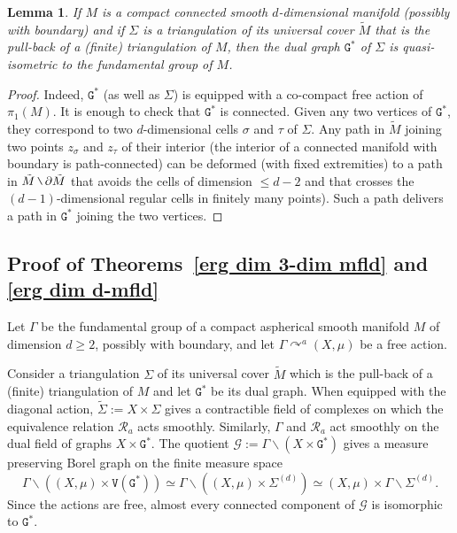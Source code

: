 \documentclass[11pt]{amsart}
\theoremstyle{definition}
\theoremstyle{plain}
\newtheorem{lemma}[definition]{Lemma}
\newcommand{\<}{\langle}
\renewcommand{\>}{\rangle}
\newcommand{\actson}{\curvearrowright}
\newcommand{\pmp}{\text{p.m.p.}}
\newcommand\RR{\mathscr{R}}
\newcommand\GGG{\mathtt{G}}
\newcommand\VVV{\mathtt{V}}
\newcommand\GG{\mathcal{G}}
\newcommand{\mysetminusD}{\hbox{\tikz{\draw[line width=0.6pt,line cap=round] (3pt,0) -- (0,6pt);}}}
\newcommand{\mysetminusT}{\mysetminusD}
\newcommand{\mysetminusS}{\hbox{\tikz{\draw[line width=0.45pt,line cap=round] (2pt,0) -- (0,4pt);}}}
\newcommand{\mysetminusSS}{\hbox{\tikz{\draw[line width=0.4pt,line cap=round] (1.5pt,0) -- (0,3pt);}}}
\newcommand{\mysetminus}{\mathbin{\mathchoice{\mysetminusD}{\mysetminusT}{\mysetminusS}{\mysetminusSS}}}%
\begin{document}
\begin{lemma}\label{lem:growth cond for dual graph}
If $M$ is a compact connected smooth $d$-dimensional manifold (possibly with boundary) and if ${\Sigma} $ is a triangulation of its universal cover $\tilde{M}$ that is the pull-back of a (finite)  triangulation of $M$, then the dual graph ${{\GGG}^*}$ of ${\Sigma} $ is quasi-isometric to the fundamental group of $M$.
\end{lemma}

\begin{proof}
Indeed, ${{\GGG}^*}$ (as well as ${\Sigma} $) is equipped with a co-compact free action of $\pi_1(M)$.
It is enough to check that ${{\GGG}^*}$ is connected.
Given any two vertices of ${{\GGG}^*}$, they correspond to two $d$-dimensional cells $\sigma$ and $\tau$ of ${\Sigma} $.
Any path in $\tilde{M}$ joining two points $z_{\sigma}$ and $z_{\tau}$ of their interior (the interior of a connected manifold with boundary is path-connected) can be deformed (with fixed extremities) to a path in $\tilde{M}\mysetminus \partial\tilde{M}$  that avoids the cells of dimension $\leq d-2$
 and that  crosses the $(d-1)$-dimensional regular cells in finitely many points). Such a path delivers a path in ${{\GGG}^*}$ joining the two vertices.
\end{proof}


\subsection{Proof of Theorems~\ref{erg dim 3-dim mfld} and \ref{erg dim d-mfld}}

Let $\Gamma$ be the fundamental group of a compact aspherical smooth manifold $M$ of dimension $d\geq 2$, possibly with boundary, and let $\Gamma \actson^a (X,\mu)$ be a free \pmp{} action.


Consider  a triangulation ${\Sigma} $ of its universal cover $\tilde{M}$ which is the pull-back of a (finite) triangulation of $M$ and let ${{\GGG}^*}$ be its dual graph.
When equipped with the diagonal action, $\widetilde{{\Sigma} }:=X\times {\Sigma} $
gives a contractible field of complexes on which the equivalence
relation $\RR_a$ acts smoothly. Similarly, $\Gamma$ and $\RR_a$ act smoothly on the dual field of graphs $X\times {{\GGG}^*}$.
The quotient $\GG:=\Gamma\backslash (X\times {{\GGG}^*})$ gives a measure preserving Borel graph on the finite measure space \[\Gamma\backslash((X,\mu)\times \VVV({{\GGG}^*}))\simeq\Gamma\backslash\left((X,\mu)\times {\Sigma} ^{(d)}\right)\simeq (X,\mu)\times \Gamma\backslash{\Sigma} ^{(d)}.\]
Since the actions are free, almost every connected component of $\GG$ is isomorphic to ${{\GGG}^*}$.
\end{document}
